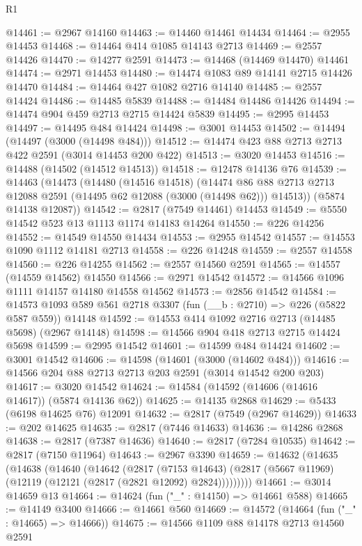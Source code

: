 \begin{lexlean}{R1}
\begin{coremodule}
@14461 := @2967 @14160
@14463 := @14460 @14461 @14434
@14464 := @2955 @14453
@14468 := @14464 @414 @1085 @14143 @2713
@14469 := @2557 @14426
@14470 := @14277 @2591
@14473 := @14468 (@14469 @14470) @14461
@14474 := @2971 @14453
@14480 := @14474 @1083 @89 @14141 @2715 @14426 @14470
@14484 := @14464 @427 @1082 @2716 @14140
@14485 := @2557 @14424
@14486 := @14485 @5839
@14488 := @14484 @14486 @14426
@14494 := @14474 @904 @459 @2713 @2715 @14424 @5839
@14495 := @2995 @14453
@14497 := @14495 @484 @14424
@14498 := @3001 @14453
@14502 := @14494 (@14497 (@3000 (@14498 @484)))
@14512 := @14474 @423 @88 @2713 @2713 @422 @2591 (@3014 @14453 @200 @422)
@14513 := @3020 @14453
@14516 := @14488 (@14502 (@14512 @14513))
@14518 := @12478 @14136 @76
@14539 := @14463
    (@14473
      (@14480
        (@14516 @14518)
        (@14474 @86 @88 @2713 @2713 @12088 @2591 (@14495 @62 @12088 (@3000 (@14498 @62))) @14513))
      (@5874 @14138 @12087))
@14542 := @2817 (@7549 @14461) @14453
@14549 := @5550 @14542 @523 @13 @1113 @1174 @14183 @14264
@14550 := @226 @14256
@14552 := @14549 @14550 @14434
@14553 := @2955 @14542
@14557 := @14553 @1090 @1112 @14181 @2713
@14558 := @226 @14248
@14559 := @2557 @14558
@14560 := @226 @14255
@14562 := @2557 @14560 @2591
@14565 := @14557 (@14559 @14562) @14550
@14566 := @2971 @14542
@14572 := @14566 @1096 @1111 @14157 @14180 @14558 @14562
@14573 := @2856 @14542
@14584 := @14573 @1093 @589 @561 @2718 @3307 (fun (__b : @2710) => @226 (@5822 @587 @559)) @14148
@14592 := @14553 @414 @1092 @2716 @2713 (@14485 @5698) (@2967 @14148)
@14598 := @14566 @904 @418 @2713 @2715 @14424 @5698
@14599 := @2995 @14542
@14601 := @14599 @484 @14424
@14602 := @3001 @14542
@14606 := @14598 (@14601 (@3000 (@14602 @484)))
@14616 := @14566 @204 @88 @2713 @2713 @203 @2591 (@3014 @14542 @200 @203)
@14617 := @3020 @14542
@14624 := @14584 (@14592 (@14606 (@14616 @14617)) (@5874 @14136 @62))
@14625 := @14135 @2868
@14629 := @5433 (@6198 @14625 @76) @12091
@14632 := @2817 (@7549 (@2967 @14629))
@14633 := @202 @14625
@14635 := @2817 (@7446 @14633)
@14636 := @14286 @2868
@14638 := @2817 (@7387 @14636)
@14640 := @2817 (@7284 @10535)
@14642 := @2817 (@7150 @11964)
@14643 := @2967 @3390
@14659 := @14632
    (@14635
      (@14638
        (@14640
          (@14642
            (@2817
              (@7153 @14643)
              (@2817 (@5667 @11969) (@12119 (@12121 (@2817 (@2821 @12092) @2824)))))))))
@14661 := @3014 @14659 @13
@14664 := @14624 (fun ("_" : @14150) => @14661 @588)
@14665 := @14149 @3400
@14666 := @14661 @560
@14669 := @14572 (@14664 (fun ("_" : @14665) => @14666))
@14675 := @14566 @1109 @88 @14178 @2713 @14560 @2591

\end{coremodule}
\end{lexlean}
